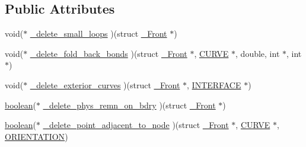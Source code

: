 \subsection*{Public Attributes}
\begin{DoxyCompactItemize}
\item 
void($\ast$ \hyperlink{struct___r_e_d_i_s_t___c_o_n_t_r_o_l_1_1___c_u_r_v_e___r_e_d_i_s_t_r_i_b_u_t_e_1_1___c_u_r_v_e___c_l_e_a_n_e_r_s_ae62bd1ac39bffa8c6793501716178cdc}{\+\_\+delete\+\_\+small\+\_\+loops} )(struct \hyperlink{struct___front}{\+\_\+\+Front} $\ast$)
\item 
void($\ast$ \hyperlink{struct___r_e_d_i_s_t___c_o_n_t_r_o_l_1_1___c_u_r_v_e___r_e_d_i_s_t_r_i_b_u_t_e_1_1___c_u_r_v_e___c_l_e_a_n_e_r_s_ac0fe53df16fd9c2e6df383c42989d69c}{\+\_\+delete\+\_\+fold\+\_\+back\+\_\+bonds} )(struct \hyperlink{struct___front}{\+\_\+\+Front} $\ast$, \hyperlink{int_8h_a4c1c272bef898dbaa20b055af85cd685}{C\+U\+R\+VE} $\ast$, double, int $\ast$, int $\ast$)
\item 
void($\ast$ \hyperlink{struct___r_e_d_i_s_t___c_o_n_t_r_o_l_1_1___c_u_r_v_e___r_e_d_i_s_t_r_i_b_u_t_e_1_1___c_u_r_v_e___c_l_e_a_n_e_r_s_ae6ac29c01b88c5d5242cb187ff3718ec}{\+\_\+delete\+\_\+exterior\+\_\+curves} )(struct \hyperlink{struct___front}{\+\_\+\+Front} $\ast$, \hyperlink{int_8h_a58cf562d0d320a608294b7310ea167dc}{I\+N\+T\+E\+R\+F\+A\+CE} $\ast$)
\item 
\hyperlink{cdecs_8h_ad048433382a936258fb49e2ec4f148e1}{boolean}($\ast$ \hyperlink{struct___r_e_d_i_s_t___c_o_n_t_r_o_l_1_1___c_u_r_v_e___r_e_d_i_s_t_r_i_b_u_t_e_1_1___c_u_r_v_e___c_l_e_a_n_e_r_s_ad5fc45993fcd558fd5b34623dbf6b052}{\+\_\+delete\+\_\+phys\+\_\+remn\+\_\+on\+\_\+bdry} )(struct \hyperlink{struct___front}{\+\_\+\+Front} $\ast$)
\item 
\hyperlink{cdecs_8h_ad048433382a936258fb49e2ec4f148e1}{boolean}($\ast$ \hyperlink{struct___r_e_d_i_s_t___c_o_n_t_r_o_l_1_1___c_u_r_v_e___r_e_d_i_s_t_r_i_b_u_t_e_1_1___c_u_r_v_e___c_l_e_a_n_e_r_s_a1f83de881fba0a7b44fc2a787945458f}{\+\_\+delete\+\_\+point\+\_\+adjacent\+\_\+to\+\_\+node} )(struct \hyperlink{struct___front}{\+\_\+\+Front} $\ast$, \hyperlink{int_8h_a4c1c272bef898dbaa20b055af85cd685}{C\+U\+R\+VE} $\ast$, \hyperlink{geom_8h_adc460053ab2088d3fe74b8b90a7a1c4c}{O\+R\+I\+E\+N\+T\+A\+T\+I\+ON})
\end{DoxyCompactItemize}


